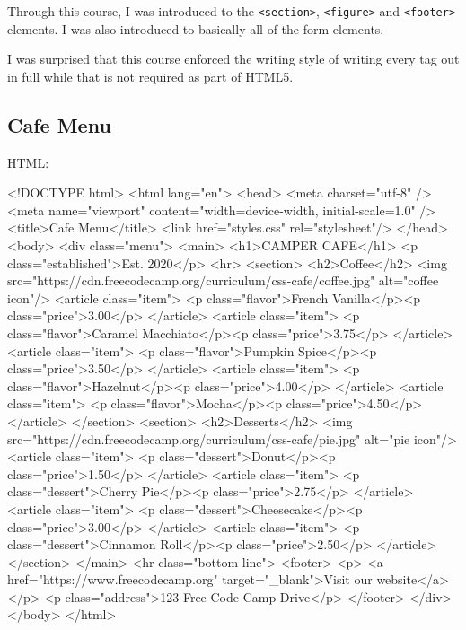 Through this course, I was introduced to the \texttt{<section>}, \texttt{<figure>} and \texttt{<footer>} elements. I was also introduced to basically all of the form elements.

I was surprised that this course enforced the writing style of writing every tag out in full while that is not required as part of HTML5.

\subsection{Cafe Menu}
HTML:
\begin{html}
<!DOCTYPE html>
<html lang="en">
  <head>
    <meta charset="utf-8" />
    <meta name="viewport" content="width=device-width, initial-scale=1.0" />
    <title>Cafe Menu</title>
    <link href="styles.css" rel="stylesheet"/>
  </head>
  <body>
    <div class="menu">
      <main>
        <h1>CAMPER CAFE</h1>
        <p class="established">Est. 2020</p>
        <hr>
        <section>
          <h2>Coffee</h2>
          <img src="https://cdn.freecodecamp.org/curriculum/css-cafe/coffee.jpg" alt="coffee icon"/>
          <article class="item">
            <p class="flavor">French Vanilla</p><p class="price">3.00</p>
          </article>
          <article class="item">
            <p class="flavor">Caramel Macchiato</p><p class="price">3.75</p>
          </article>
          <article class="item">
            <p class="flavor">Pumpkin Spice</p><p class="price">3.50</p>
          </article>
          <article class="item">
            <p class="flavor">Hazelnut</p><p class="price">4.00</p>
          </article>
          <article class="item">
            <p class="flavor">Mocha</p><p class="price">4.50</p>
          </article>
        </section>
        <section>
          <h2>Desserts</h2>
          <img src="https://cdn.freecodecamp.org/curriculum/css-cafe/pie.jpg" alt="pie icon"/>
          <article class="item">
            <p class="dessert">Donut</p><p class="price">1.50</p>
          </article>
          <article class="item">
            <p class="dessert">Cherry Pie</p><p class="price">2.75</p>
          </article>
          <article class="item">
            <p class="dessert">Cheesecake</p><p class="price">3.00</p>
          </article>
          <article class="item">
            <p class="dessert">Cinnamon Roll</p><p class="price">2.50</p>
          </article>
        </section>
      </main>
      <hr class="bottom-line">
      <footer>
        <p>
          <a href="https://www.freecodecamp.org" target="_blank">Visit our website</a>
        </p>
        <p class="address">123 Free Code Camp Drive</p>
      </footer>
    </div>
  </body>
</html>
\end{html}
